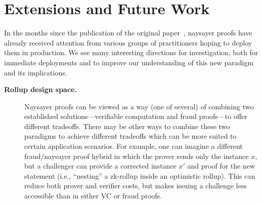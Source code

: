 \section{Extensions and Future Work}\label{sec:naysayer_extensions}

In the months since the publication of the original paper~\cite{FC:SerGlaBon24}, naysayer proofs have already received attention from various groups of practitioners hoping to deploy them in production. We see many interesting directions for investigation, both for immediate deployments and to improve our understanding of this new paradigm and its implications.

\begin{description}
    \item[\textbf{Rollup design space.}] Naysayer proofs can be viewed as a way (one of several) of combining two established solutions---verifiable computation and fraud proofs---to offer different tradeoffs. There may be other ways to combine these two paradigms to achieve different tradeoffs which can be more suited to certain application scenarios. For example, one can imagine a different fraud/naysayer proof hybrid in which the prover sends only the instance $x$, but a challenger can provide a corrected instance $x'$ and proof for the new statement (i.e., ``nesting'' a zk-rollup inside an optimistic rollup). This can reduce both prover and verifier costs, but makes issuing a challenge less accessible than in either VC or fraud proofs.
    


\end{description}
